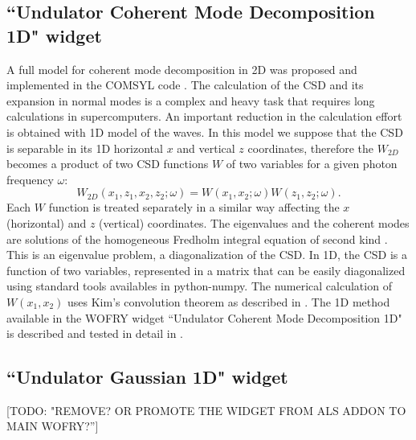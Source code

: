 \documentclass{iopconfser}
\newcommand{\todo}[1]{{\color{red}[TODO: "#1'']}}
\begin{document}
\subsection{``Undulator Coherent Mode Decomposition 1D" widget}
\label{sec:CMD}

A full model for coherent mode decomposition in 2D was proposed and implemented in the COMSYL code \cite{glass2017}. The calculation of the CSD and its expansion in normal modes is a complex and heavy task that requires long calculations in supercomputers. 
An important reduction in the calculation effort is obtained with 1D model of the waves. In this model we suppose that the CSD is separable in its 1D horizontal $x$ and vertical $z$ coordinates, therefore the $W_{2D}$ becomes a product of two CSD functions $W$ of two variables for a given photon frequency $\omega$:
\begin{equation}
W_{2D}(x_1,z_1,x_2,z_2;\omega) = W(x_1,x_2;\omega) W(z_1,z_2;\omega).
\label{eq:CSD_2D}
\end{equation}
Each $W$ function is treated separately in a similar way affecting the $x$ (horizontal) and $z$ (vertical) coordinates.
The eigenvalues and the coherent modes are solutions of the homogeneous Fredholm integral equation of second kind \cite{glass2017}. This is an eigenvalue problem, a diagonalization of the CSD.  In 1D, the CSD is a function of two variables, represented in a matrix that can be easily diagonalized using standard tools availables in python-numpy. The numerical calculation of $W(x_1,x_2)$ uses Kim's convolution theorem \cite{kim1986b} as described in \cite{glass2017}. 
The 1D method  available in the WOFRY widget ``Undulator Coherent Mode Decomposition 1D" is described and tested in detail in \cite{SanchezdelRio2022CMD}.

\subsection{``Undulator Gaussian 1D" widget} \todo{REMOVE? OR PROMOTE THE WIDGET FROM ALS ADDON TO MAIN WOFRY?}
\label{sec:undulatorG}
\end{document}
